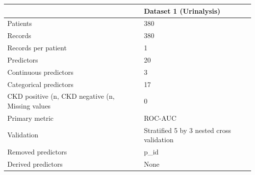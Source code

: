 \begin{tabular}{ll}
\toprule
 & Dataset 1 (Urinalysis) \\
\midrule
Patients & 380 \\
Records & 380 \\
Records per patient & 1 \\
Predictors & 20 \\
Continuous predictors & 3 \\
Categorical predictors & 17 \\
CKD positive (n, %
CKD negative (n, %
Missing values & 0 \\
Primary metric & ROC-AUC \\
Validation & Stratified 5 by 3 nested cross validation \\
Removed predictors & p_id \\
Derived predictors & None \\
\bottomrule
\end{tabular}
